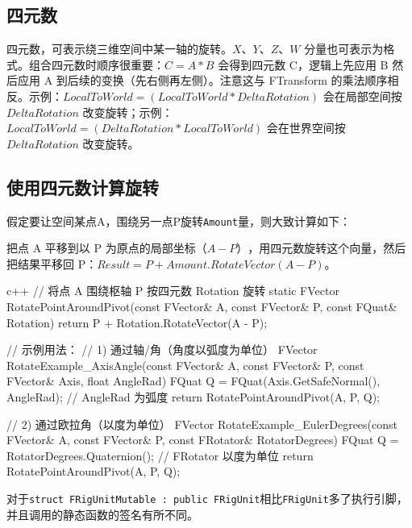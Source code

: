 \documentclass[math,code,12pt]{amznotes}
\newcommand{\il}[1]{\texttt{#1}}%
\begin{document}
\subsection{四元数}
四元数，可表示绕三维空间中某一轴的旋转。$X、Y、Z、W$ 分量也可表示为格式。组合四元数时顺序很重要：$C = A * B$ 会得到四元数 C，逻辑上先应用 B 然后应用 A 到后续的变换（先右侧再左侧）。注意这与 FTransform 的乘法顺序相反。示例：$LocalToWorld = (LocalToWorld * DeltaRotation)$ 会在局部空间按 $DeltaRotation$ 改变旋转；示例：$LocalToWorld = (DeltaRotation * LocalToWorld)$ 会在世界空间按 $DeltaRotation$ 改变旋转。
\subsection{使用四元数计算旋转}
假定要让空间某点A，围绕另一点P旋转\il{Amount}量，则大致计算如下：
\begin{notebox}
把点 A 平移到以 P 为原点的局部坐标$（A - P）$，用四元数旋转这个向量，然后把结果平移回 P：$Result = P + Amount.RotateVector(A - P)$。
\end{notebox}

\begin{amzcode}{c++}
// 将点 A 围绕枢轴 P 按四元数 Rotation 旋转
static FVector RotatePointAroundPivot(const FVector& A, const FVector& P, const FQuat& Rotation)
{
    return P + Rotation.RotateVector(A - P);
}

// 示例用法：
// 1) 通过轴/角（角度以弧度为单位）
FVector RotateExample_AxisAngle(const FVector& A, const FVector& P, const FVector& Axis, float AngleRad)
{
    FQuat Q = FQuat(Axis.GetSafeNormal(), AngleRad); // AngleRad 为弧度
    return RotatePointAroundPivot(A, P, Q);
}

// 2) 通过欧拉角（以度为单位）
FVector RotateExample_EulerDegrees(const FVector& A, const FVector& P, const FRotator& RotatorDegrees)
{
    FQuat Q = RotatorDegrees.Quaternion(); // FRotator 以度为单位
    return RotatePointAroundPivot(A, P, Q);
}
\end{amzcode}
对于\il{struct FRigUnitMutable : public FRigUnit}相比\il{FRigUnit}多了执行引脚，并且调用的静态函数的签名有所不同。
\end{document}
